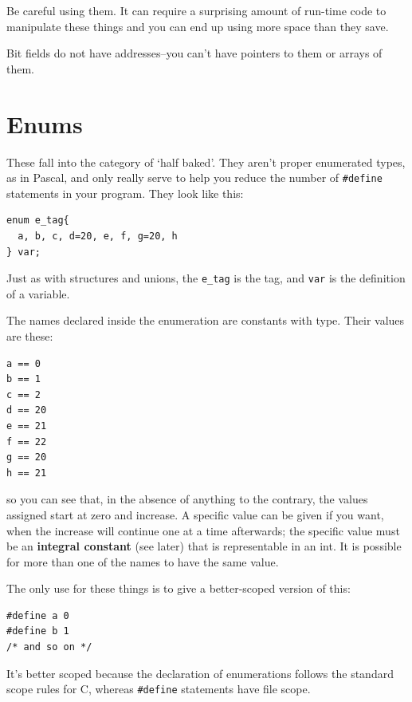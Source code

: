   Be careful using them. It can require a surprising amount of run-time code
   to manipulate these things and you can end up using more space than they
   save.


  Bit fields do not have addresses--you can't have pointers to them or
   arrays of them.


 
        \section{Enums}
        

  

  These fall into the category of `half baked'. They aren't proper
   enumerated types, as in Pascal, and only really serve to help you reduce the
   number of \texttt{\#define} statements in your program. They look like
   this:


  \begin{Verbatim}
enum e_tag{
  a, b, c, d=20, e, f, g=20, h
} var;
\end{Verbatim}

  Just as with structures and unions, the \texttt{e\_tag} is the tag, and
   \texttt{var} is the definition of a variable.


  The names declared inside the enumeration are constants with
   \kint{} type. Their values are these:


  \begin{Verbatim}
a == 0
b == 1
c == 2
d == 20
e == 21
f == 22
g == 20
h == 21
\end{Verbatim}

  so you can see that, in the absence of anything to the contrary, the
   values assigned start at zero and increase. A specific value can be given if
   you want, when the increase will continue one at a time afterwards; the
   specific value must be an \textbf{integral constant} (see later) that is
   representable in an int. It is possible for more than one of the names to
   have the same value.


  The only use for these things is to give a better-scoped version of
   this:


  \begin{Verbatim}
#define a 0
#define b 1
/* and so on */
\end{Verbatim}

  It's better scoped because the declaration of enumerations follows the
   standard scope rules for C, whereas \texttt{\#define} statements have
   file scope.


